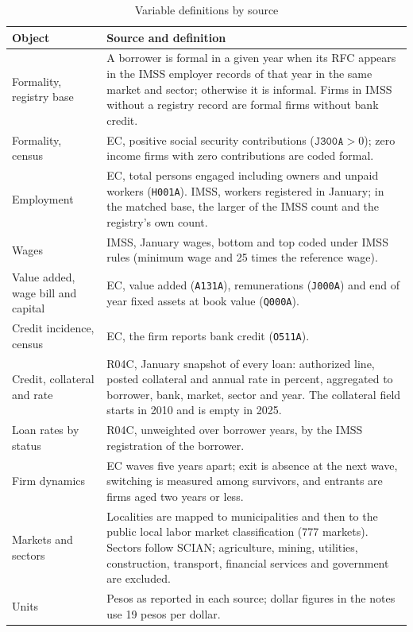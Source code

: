 \documentclass[12pt]{article}
\begin{document}
\begin{table}[H]
\centering\small
\caption{Variable definitions by source}
\label{tab:definitions}
\begin{tabular}{p{}p{}}
\toprule
Object & Source and definition \\
\midrule
Formality, registry base & A borrower is formal in a given year when its RFC appears in the IMSS employer records of that year in the same market and sector; otherwise it is informal. Firms in IMSS without a registry record are formal firms without bank credit. \\
Formality, census & EC, positive social security contributions ($\texttt{J300A}>0$); zero income firms with zero contributions are coded formal. \\
Employment & EC, total persons engaged including owners and unpaid workers (\texttt{H001A}). IMSS, workers registered in January; in the matched base, the larger of the IMSS count and the registry's own count. \\
Wages & IMSS, January wages, bottom and top coded under IMSS rules (minimum wage and 25 times the reference wage). \\
Value added, wage bill and capital & EC, value added (\texttt{A131A}), remunerations (\texttt{J000A}) and end of year fixed assets at book value (\texttt{Q000A}). \\
Credit incidence, census & EC, the firm reports bank credit (\texttt{O511A}). \\
Credit, collateral and rate & R04C, January snapshot of every loan: authorized line, posted collateral and annual rate in percent, aggregated to borrower, bank, market, sector and year. The collateral field starts in 2010 and is empty in 2025. \\
Loan rates by status & R04C, unweighted over borrower years, by the IMSS registration of the borrower. \\
Firm dynamics & EC waves five years apart; exit is absence at the next wave, switching is measured among survivors, and entrants are firms aged two years or less. \\
Markets and sectors & Localities are mapped to municipalities and then to the public local labor market classification (777 markets). Sectors follow SCIAN; agriculture, mining, utilities, construction, transport, financial services and government are excluded. \\
Units & Pesos as reported in each source; dollar figures in the notes use 19 pesos per dollar. \\
\bottomrule
\end{tabular}
\end{table}
\end{document}
